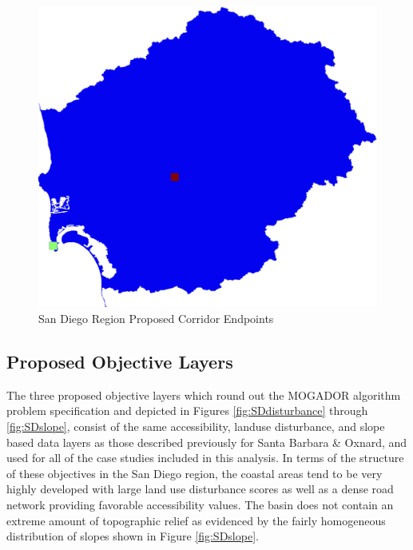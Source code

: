         \begin{figure}[!h]
            \begin{center}
            \includegraphics[width=5.5in]{figures/SanDiego_Endpoints.png}   
            \caption{San Diego Region Proposed Corridor Endpoints}
            \label{fig:SDendpoints}
            \end{center}
        \end{figure}

    \subsection{Proposed Objective Layers}
    
The three proposed objective layers which round out the MOGADOR algorithm problem specification and depicted in Figures \ref{fig:SDdisturbance} through \ref{fig:SDslope}, consist of the same accessibility, landuse disturbance, and slope based data layers as those described previously for Santa Barbara \& Oxnard, and used for all of the case studies included in this analysis. In terms of the structure of these objectives in the San Diego region, the coastal areas tend to be very highly developed with large land use disturbance scores as well as a dense road network providing favorable accessibility values. The basin does not contain an extreme amount of topographic relief as evidenced by the fairly homogeneous distribution of slopes shown in Figure \ref{fig:SDslope}.

